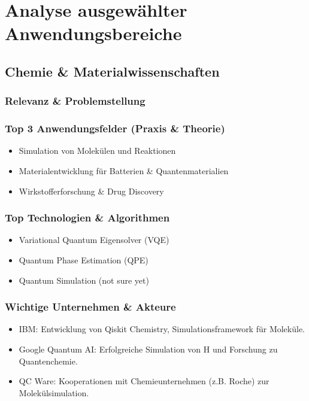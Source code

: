\section{Analyse ausgewählter Anwendungsbereiche}

\subsection{Chemie \& Materialwissenschaften}

\subsubsection*{Relevanz \& Problemstellung}
\subsubsection*{Top 3 Anwendungsfelder (Praxis \& Theorie)}
\begin{itemize}
    \item Simulation von Molekülen und Reaktionen
    \item Materialentwicklung für Batterien \& Quantenmaterialien
    \item Wirkstofferforschung \& Drug Discovery
\end{itemize}
\subsubsection*{Top Technologien \& Algorithmen}
\begin{itemize}
    \item Variational Quantum Eigensolver (VQE)
    \item Quantum Phase Estimation (QPE)
    \item Quantum Simulation (not sure yet)
\end{itemize}

\subsubsection*{Wichtige Unternehmen \& Akteure}
\begin{itemize}
    \item IBM: Entwicklung von Qiskit Chemistry, Simulationsframework für Moleküle.
    \item Google Quantum AI: Erfolgreiche Simulation von H\₂ und Forschung zu Quantenchemie.
    \item QC Ware: Kooperationen mit Chemieunternehmen (z.B. Roche) zur Molekülsimulation.
\end{itemize}
